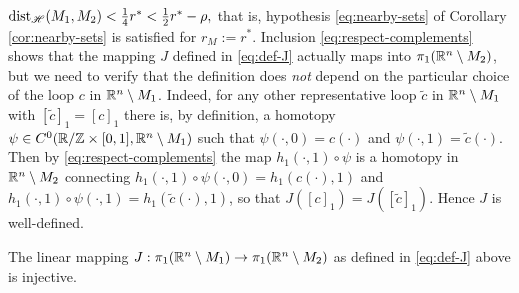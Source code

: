 $\operatorname{dist}_{\mathscr{H}}(M_1,M_2)<\frac14 r^*<\frac12 r^*-\rho, $
that is, hypothesis \eqref{eq:nearby-sets} of Corollary \ref{cor:nearby-sets}
is satisfied for $r_M:=r^*$.
Inclusion \eqref{eq:respect-complements} shows that the mapping
$J$ defined in
\eqref{eq:def-J}  actually maps into $\pi_1(\mathbb{R}^n\setminus M_2)$, but we need to
verify that the definition does \emph{not} depend on the particular choice
of the loop $c$ in $\mathbb{R}^n\setminus M_1$. Indeed, for any other representative
loop $\tilde{c}$ in $\mathbb{R}^n\setminus M_1$ with $[\tilde{c}]_1=[c]_1$ there is,
by definition, a homotopy $\psi\in C^0(%
\R/\Z\times [0,1],\R^n\setminus M_1)$ such that
$\psi(\cdot,0)=c(\cdot)$ and $\psi(\cdot,1)=\tilde{c}(\cdot)$. Then by 
\eqref{eq:respect-complements} the map $h_1(\cdot,1)\circ\psi$ is a homotopy in $\mathbb{R}^n\setminus
M_2$ connecting $h_1(\cdot,1)\circ\psi(\cdot,0)=h_1(c(\cdot),1)$ and
$h_1(\cdot,1)\circ\psi(\cdot,1)=h_1(\tilde{c}(\cdot),1)$, so that
$J([c]_1)=J([\tilde{c}]_1).$ Hence $J$ is well-defined.
\begin{lemma}[$J$ injective]\label{lem:injective}
The linear mapping $J:\pi_1(\mathbb{R}^n\setminus M_1)\to\pi_1(\mathbb{R}^n\setminus M_2)$
as defined in \eqref{eq:def-J} above is injective.
\end{lemma}
